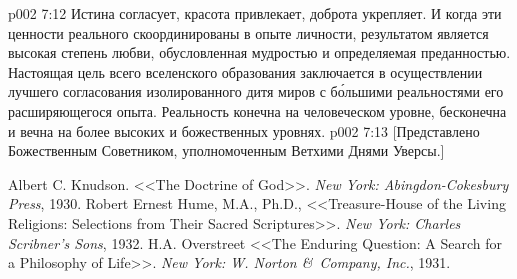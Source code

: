 \vs p002 7:12 Истина согласует, красота привлекает, доброта укрепляет. И когда эти ценности реального скоординированы в опыте личности, результатом является высокая степень любви, обусловленная мудростью и определяемая преданностью. Настоящая цель всего вселенского образования заключается в осуществлении лучшего согласования изолированного дитя миров с б\'ольшими реальностями его расширяющегося опыта. Реальность конечна на человеческом уровне, бесконечна и вечна на более высоких и божественных уровнях.
\vsetoff
\vs p002 7:13 [Представлено Божественным Советником, уполномоченным Ветхими Днями Уверсы.]
\quizlink
\begin{thebibliography}{100}
Albert C. Knudson.
{<<The Doctrine of God>>.}
{\em New York: Abingdon-Cokesbury Press}, 1930.
Robert Ernest Hume, M.A., Ph.D.,
{<<Treasure\hyp{}House of the Living Religions: Selections from Their Sacred Scriptures>>.}
{\em New York: Charles Scribner's Sons}, 1932.
H.A. Overstreet
{<<The Enduring Question: A Search for a Philosophy of Life>>.}
{\em New York: W. Norton \&\ Company, Inc.}, 1931.
\end{thebibliography}
